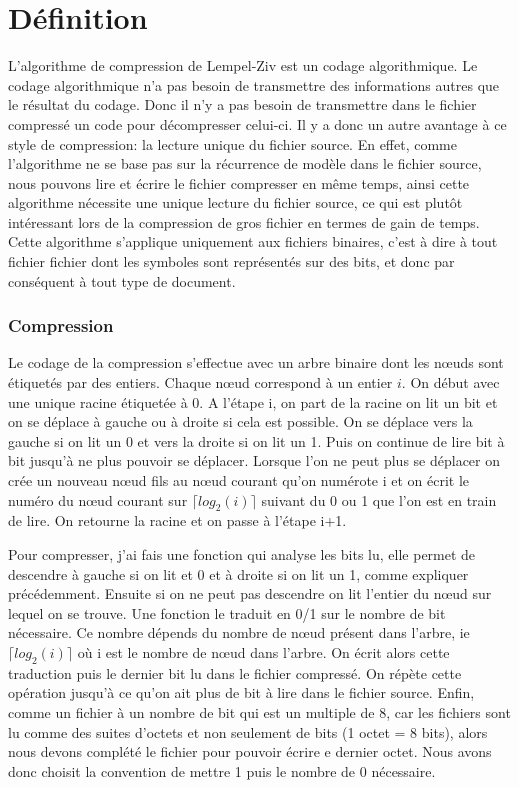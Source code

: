 \documentclass{report}
\begin{document}
\section*{Définition }

L'algorithme de compression de Lempel-Ziv est un codage algorithmique.  Le codage algorithmique n’a pas besoin de transmettre des informations autres que le résultat du codage. Donc il n'y a pas besoin de transmettre dans le fichier compressé un code pour décompresser celui-ci. Il y a donc un autre avantage à ce style de compression: la lecture unique du fichier source. En effet, comme l'algorithme ne se base pas sur la récurrence de modèle dans le fichier source, nous pouvons lire et écrire le fichier compresser en même temps, ainsi cette algorithme nécessite une unique lecture du fichier source, ce qui est plutôt intéressant lors de la compression de gros fichier en termes de gain de temps. 
Cette algorithme s'applique uniquement aux fichiers binaires, c'est à dire à tout fichier fichier dont les symboles sont représentés sur des bits, et donc par conséquent à tout type de document. 

\subsubsection{Compression}
Le codage de la compression s'effectue avec un arbre binaire dont les nœuds sont étiquetés par des entiers. Chaque nœud correspond à un entier $i$. On début avec une unique racine étiquetée à 0.
A l'étape i, on part de la racine on lit un bit et on se déplace à gauche ou à droite si cela est possible. On se déplace vers la gauche si on lit un 0 et vers la droite si on lit un 1. Puis on continue de lire bit à bit jusqu'à ne plus pouvoir se déplacer. Lorsque l'on ne peut plus se déplacer on crée un nouveau nœud fils au nœud courant qu'on numérote i et on écrit le numéro du nœud courant sur $\lceil log_{2}(i) \rceil$ suivant du 0 ou 1 que l'on est en train de lire.
On retourne la racine et on passe à l'étape i+1.

Pour compresser, j'ai fais une fonction qui analyse les bits lu, elle permet de descendre à gauche si on lit et 0 et à droite si on lit un 1, comme expliquer précédemment. Ensuite si on ne peut pas descendre on lit l'entier du nœud sur lequel on se trouve. Une fonction le traduit en 0/1 sur le nombre de bit nécessaire. Ce nombre dépends du nombre de nœud présent dans l'arbre, ie $\lceil log_{2}(i) \rceil$ où i est le nombre de nœud dans l'arbre. 
On écrit alors cette traduction puis le dernier bit lu dans le fichier compressé. On répète cette opération jusqu'à ce qu'on ait plus de bit  à lire dans le fichier source.
Enfin, comme un fichier à un nombre de bit qui est un multiple de 8, car les fichiers sont lu comme des suites d'octets et non seulement de bits (1 octet = 8 bits),  alors nous devons complété le fichier pour pouvoir écrire e dernier octet.
Nous avons donc choisit la convention de mettre 1 puis le nombre de 0 nécessaire. 
\end{document}
